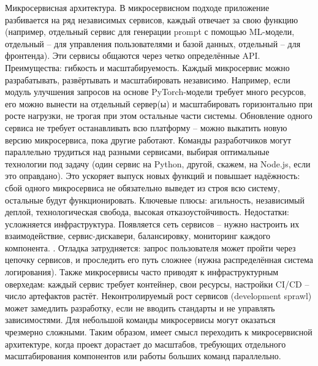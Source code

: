 Микросервисная архитектура. В микросервисном подходе приложение разбивается на ряд независимых сервисов, каждый отвечает за свою функцию (например, отдельный сервис для генерации prompt с помощью ML-модели, отдельный – для управления пользователями и базой данных, отдельный – для фронтенда). Эти сервисы общаются через четко определённые API. Преимущества: гибкость и масштабируемость. Каждый микросервис можно разрабатывать, развёртывать и масштабировать независимо\cite{atlassian:microservices}. Например, если модуль улучшения запросов на основе PyTorch-модели требует много ресурсов, его можно вынести на отдельный сервер(ы) и масштабировать горизонтально при росте нагрузки, не трогая при этом остальные части системы. Обновление одного сервиса не требует останавливать всю платформу – можно выкатить новую версию микросервиса, пока другие работают. Команды разработчиков могут параллельно трудиться над разными сервисами, выбирая оптимальные технологии под задачу (один сервис на Python, другой, скажем, на Node.js, если это оправдано)\cite{atlassian:microservices}. Это ускоряет выпуск новых функций и повышает надёжность: сбой одного микросервиса не обязательно выведет из строя всю систему, остальные будут функционировать. Ключевые плюсы: агильность, независимый деплой, технологическая свобода, высокая отказоустойчивость\cite{atlassian:microservices}. Недостатки: усложняется инфраструктура. Появляется сеть сервисов – нужно настроить их взаимодействие, сервис-дискавери, балансировку, мониторинг каждого компонента\cite{atlassian:microservices}. . Отладка затрудняется: запрос пользователя может пройти через цепочку сервисов, и проследить его путь сложнее (нужна распределённая система логирования). Также микросервисы часто приводят к инфраструктурным оверхедам: каждый сервис требует контейнер, свои ресурсы, настройки CI/CD – число артефактов растёт\cite{atlassian:microservices}. Неконтролируемый рост сервисов (development sprawl) может замедлить разработку, если не вводить стандарты и не управлять зависимостями\cite{atlassian:microservices}. Для небольшой команды микросервисы могут оказаться чрезмерно сложными. Таким образом, имеет смысл переходить к микросервисной архитектуре, когда проект дорастает до масштабов, требующих отдельного масштабирования компонентов или работы больших команд параллельно. 

